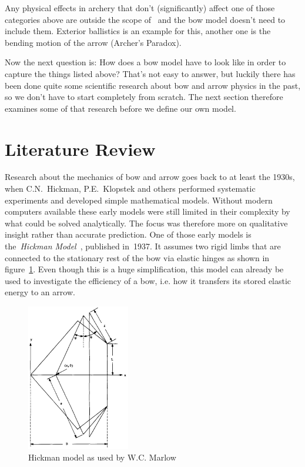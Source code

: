 Any physical effects in archery that don't (significantly) affect one of those categories above are outside the scope of \swtitle\ and the bow model doesn't need to include them.
Exterior ballistics is an example for this, another one is the bending motion of the arrow (Archer's Paradox).

Now the next question is: How does a bow model have to look like in order to capture the things listed above?
That's not easy to answer, but luckily there has been done quite some scientific research about bow and arrow physics in the past, so we don't have to start completely from scratch.
The next section therefore examines some of that research before we define our own model.

\section{Literature Review}

Research about the mechanics of bow and arrow goes back to at least the 1930s, when C.N.~Hickman, P.E.~Klopstek and others performed systematic experiments and developed simple mathematical models.
Without modern computers available these early models were still limited in their complexity by what could be solved analytically.
The focus was therefore more on qualitative insight rather than accurate prediction.
One of those early models is the~\textit{Hickman Model}~\cite{bib:hi37}, published in~1937.
It assumes two rigid limbs that are connected to the stationary rest of the bow via elastic hinges as shown in figure~\ref{fig:model:hickman}.
Even though this is a huge simplification, this model can already be used to investigate the efficiency of a bow, i.e. how it transfers its stored elastic energy to an arrow.

\begin{figure}[h]
\centering
\includegraphics[width=0.4\textwidth]{figures/model/hickman}
\caption{Hickman model as used by W.C. Marlow \cite{bib:ma80}}
\label{fig:model:hickman}
\end{figure}

